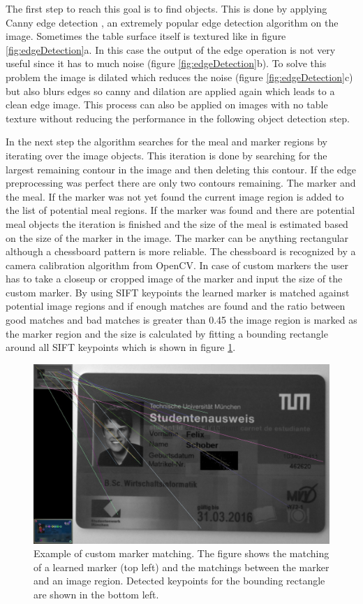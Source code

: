 The first step to reach this goal is to find objects. This is done by applying Canny edge detection \cite{Canny1986}, an extremely popular edge detection algorithm on the image. Sometimes the table surface itself is textured like in figure \ref{fig:edgeDetection}a. In this case the output of the edge operation is not very useful since it has to much noise {(figure \ref{fig:edgeDetection}b)}. To solve this problem the image is dilated which reduces the noise {(figure \ref{fig:edgeDetection}c)} but also blurs edges so canny and dilation are applied again which leads to a clean edge image. This process can also be applied on images with no table texture without reducing the performance in the following object detection step.

In the next step the algorithm searches for the meal and marker regions by iterating over the image objects. This iteration is done by searching for the largest remaining contour in the image and then deleting this contour. If the edge preprocessing was perfect there are only two contours remaining. The marker and the meal. If the marker was not yet found the current image region is added to the list of potential meal regions. If the marker was found and there are potential meal objects the iteration is finished and the size of the meal is estimated based on the size of the marker in the image. The marker can be anything rectangular although a chessboard pattern is more reliable. The chessboard is recognized by a camera calibration algorithm from OpenCV. In case of custom markers the user has to take a closeup or cropped image of the marker and input the size of the custom marker. By using SIFT keypoints the learned marker is matched against potential image regions and if enough matches are found and the ratio between good matches and bad matches is greater than 0.45 the image region is marked as the marker region and the size is calculated by fitting a bounding rectangle around all SIFT keypoints which is shown in figure \ref{fig:markerMatching}.

\begin{figure}
	\centering
	\includegraphics[scale=0.2]{data/images/results/segmentation/resultsMarker_1_matches}		
	\caption{Example of custom marker matching. The figure shows the matching of a learned marker {(top left)} and the matchings between the marker and an image region. Detected keypoints for the bounding rectangle are shown in the bottom left.}
	\label{fig:markerMatching}
\end{figure}

